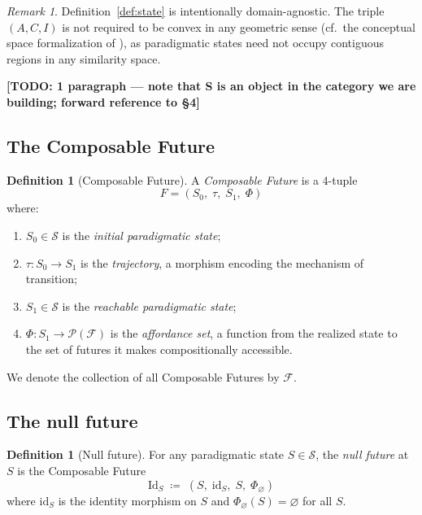 \documentclass[11pt, a4paper]{article}
\theoremstyle{plain}
\theoremstyle{definition}
\newtheorem{definition}[theorem]{Definition}
\theoremstyle{remark}
\newtheorem{remark}[theorem]{Remark}
\newcommand{\nullfut}{\mathrm{Id}}             %
\newcommand{\Fut}{\mathcal{F}}                 %
\newcommand{\Pow}[1]{\mathcal{P}(#1)}         %
\newcommand{\States}{\mathcal{S}}              %
\newcommand{\Szero}{S_0}                       %
\newcommand{\Sone}{S_1}                        %
\newcommand{\traj}{\tau}                       %
\newcommand{\aff}{\Phi}                        %
\newcommand{\cf}{cf.\xspace}
\begin{document}
\begin{remark}
Definition~\ref{def:state} is intentionally domain-agnostic.
The triple $(A, C, I)$ is not required to be convex in any geometric sense
(\cf\ the conceptual space formalization of
\textcite{bechberger2017thorough}), as paradigmatic states need not occupy
contiguous regions in any similarity space.
\end{remark}

\textbf{[TODO: 1 paragraph — note that S is an object in the category we
are building; forward reference to \S4]}

\subsection{The Composable Future}

\begin{definition}[Composable Future]
\label{def:future}
A \emph{Composable Future} is a 4-tuple
\[
  F = (\Szero,\; \traj,\; \Sone,\; \aff)
\]
where:
\begin{enumerate}[label=(\roman*), itemsep=3pt]
  \item $\Szero \in \States$ is the \emph{initial paradigmatic state};
  \item $\traj\colon \Szero \to \Sone$ is the \emph{trajectory}, a morphism
        encoding the mechanism of transition;
  \item $\Sone \in \States$ is the \emph{reachable paradigmatic state};
  \item $\aff\colon \Sone \to \Pow{\Fut}$ is the \emph{affordance set},
        a function from the realized state to the set of futures it makes
        compositionally accessible.
\end{enumerate}
We denote the collection of all Composable Futures by $\Fut$.
\end{definition}

\subsection{The null future}

\begin{definition}[Null future]
\label{def:null}
For any paradigmatic state $S \in \States$, the \emph{null future} at $S$
is the Composable Future
\[
  \nullfut_S \;\coloneqq\; (S,\; \mathrm{id}_S,\; S,\; \aff_\varnothing)
\]
where $\mathrm{id}_S$ is the identity morphism on $S$ and
$\aff_\varnothing(S) = \varnothing$ for all $S$.
\end{definition}
\end{document}
